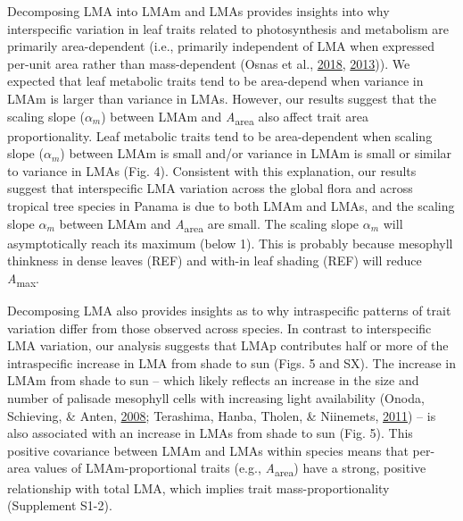 \documentclass[12pt,]{article}
\theoremstyle{definition}
\theoremstyle{definition}
\theoremstyle{definition}
\theoremstyle{remark}
\begin{document}
Decomposing LMA into LMAm and LMAs provides insights into why
interspecific variation in leaf traits related to photosynthesis and
metabolism are primarily area-dependent (i.e., primarily independent of
LMA when expressed per-unit area rather than mass-dependent (Osnas et
al., \protect\hyperlink{ref-Osnas2018}{2018},
\protect\hyperlink{ref-Osnas2013}{2013})). We expected that leaf
metabolic traits tend to be area-depend when variance in LMAm is larger
than variance in LMAs. However, our results suggest that the scaling
slope (\(\alpha_m\)) between LMAm and \emph{A}\textsubscript{area} also
affect trait area proportionality. Leaf metabolic traits tend to be
area-dependent when scaling slope (\(\alpha_m\)) between LMAm is small
and/or variance in LMAm is small or similar to variance in LMAs (Fig.
4). Consistent with this explanation, our results suggest that
interspecific LMA variation across the global flora and across tropical
tree species in Panama is due to both LMAm and LMAs, and the scaling
slope \(\alpha_m\) between LMAm and \emph{A}\textsubscript{area} are
small. The scaling slope \(\alpha_m\) will asymptotically reach its
maximum (below 1). This is probably because mesophyll thinkness in dense
leaves (REF) and with-in leaf shading (REF) will reduce
\emph{A}\textsubscript{max}.

Decomposing LMA also provides insights as to why intraspecific patterns
of trait variation differ from those observed across species. In
contrast to interspecific LMA variation, our analysis suggests that LMAp
contributes half or more of the intraspecific increase in LMA from shade
to sun (Figs. 5 and SX). The increase in LMAm from shade to sun -- which
likely reflects an increase in the size and number of palisade mesophyll
cells with increasing light availability (Onoda, Schieving, \& Anten,
\protect\hyperlink{ref-Onoda2008}{2008}; Terashima, Hanba, Tholen, \&
Niinemets, \protect\hyperlink{ref-Terashima2011}{2011}) -- is also
associated with an increase in LMAs from shade to sun (Fig. 5). This
positive covariance between LMAm and LMAs within species means that
per-area values of LMAm-proportional traits (e.g.,
\emph{A}\textsubscript{area}) have a strong, positive relationship with
total LMA, which implies trait mass-proportionality (Supplement S1-2).
\end{document}
